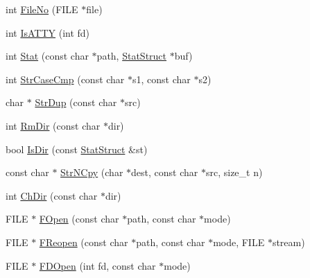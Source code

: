 \begin{DoxyCompactItemize}
\item 
int \mbox{\hyperlink{namespacetesting_1_1internal_1_1posix_a3117b067e1f942a2031e666953120ccc}{File\+No}} (F\+I\+LE $\ast$file)
\item 
int \mbox{\hyperlink{namespacetesting_1_1internal_1_1posix_a16ebe936b3a8ea462a94191635aedc27}{Is\+A\+T\+TY}} (int fd)
\item 
int \mbox{\hyperlink{namespacetesting_1_1internal_1_1posix_a2b87b7ff647a128614daf50667eb9304}{Stat}} (const char $\ast$path, \mbox{\hyperlink{namespacetesting_1_1internal_1_1posix_a8eb9f08d3af29941c2d2a964cfff3ecb}{Stat\+Struct}} $\ast$buf)
\item 
int \mbox{\hyperlink{namespacetesting_1_1internal_1_1posix_a1ef2385a7f8e4c706054da35967e76bd}{Str\+Case\+Cmp}} (const char $\ast$s1, const char $\ast$s2)
\item 
char $\ast$ \mbox{\hyperlink{namespacetesting_1_1internal_1_1posix_a5c0864ea9d81d27332b9133e35cbc43c}{Str\+Dup}} (const char $\ast$src)
\item 
int \mbox{\hyperlink{namespacetesting_1_1internal_1_1posix_acbad5d4ea5b73fd1765f5f760642932a}{Rm\+Dir}} (const char $\ast$dir)
\item 
bool \mbox{\hyperlink{namespacetesting_1_1internal_1_1posix_af0d04ed5baeed28353fa38742748a421}{Is\+Dir}} (const \mbox{\hyperlink{namespacetesting_1_1internal_1_1posix_a8eb9f08d3af29941c2d2a964cfff3ecb}{Stat\+Struct}} \&st)
\item 
const char $\ast$ \mbox{\hyperlink{namespacetesting_1_1internal_1_1posix_a3defc980438fce16cf5320a458ccea17}{Str\+N\+Cpy}} (char $\ast$dest, const char $\ast$src, size\+\_\+t n)
\item 
int \mbox{\hyperlink{namespacetesting_1_1internal_1_1posix_a1ddc8a4fc6bb21da372307485591a212}{Ch\+Dir}} (const char $\ast$dir)
\item 
F\+I\+LE $\ast$ \mbox{\hyperlink{namespacetesting_1_1internal_1_1posix_affa05d06d3e3b1ce975935cb0eac4fa7}{F\+Open}} (const char $\ast$path, const char $\ast$mode)
\item 
F\+I\+LE $\ast$ \mbox{\hyperlink{namespacetesting_1_1internal_1_1posix_a7428e40e37fc1798e36804eafc11680b}{F\+Reopen}} (const char $\ast$path, const char $\ast$mode, F\+I\+LE $\ast$stream)
\item 
F\+I\+LE $\ast$ \mbox{\hyperlink{namespacetesting_1_1internal_1_1posix_a78eb38374e5a5c87ab0cbb30583627f7}{F\+D\+Open}} (int fd, const char $\ast$mode)
\item 

\end{DoxyCompactItemize}
